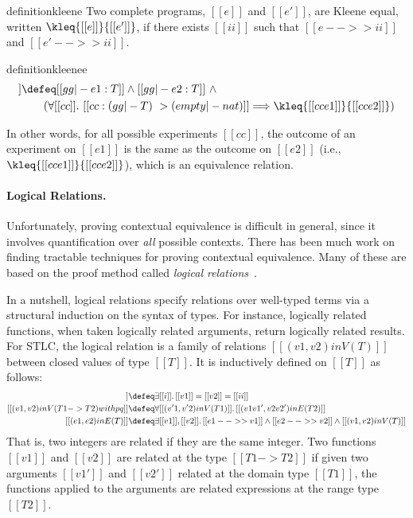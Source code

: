\begin{restatable}{definition}{kleene}
  Two complete programs, $[[e]]$ and $[[e']]$, are Kleene equal, written
  $\kleq{[[e]]}{[[e']]}$, if there exists $[[ii]]$ such that $[[e -->> ii]]$ and $[[e' -->> ii]]$.
\end{restatable}


\begin{restatable}{definition}{kleenee}  \label{def:cxtx}%
  \begin{align*}
    [[gg |- e1 ~= e2 : T]]  & \defeq [[gg |- e1 : T]] \land [[gg |- e2 : T]] \ \land \\
                                 & \qquad (\forall [[cc]].\ [[cc : (gg |- T) ~> (empty |- nat)]]  \Longrightarrow \kleq{[[cc{e1}]]}{[[cc{e2}]]})
  \end{align*}
\end{restatable}

In other words, for all possible experiments $[[ cc ]]$, the outcome of an
experiment on $[[e1]]$ is the same as the outcome on $[[e2]]$
(i.e., $\kleq{[[cc{e1}]]}{[[cc{e2}]]}$), which is an equivalence relation.


\paragraph{Logical Relations.}

Unfortunately, proving contextual equivalence is difficult in general, since it
involves quantification over \textit{all} possible contexts. There has been much
work on finding tractable techniques for proving contextual equivalence. Many
of these are based on the proof method called \emph{logical
  relations}~\citep{tait, plotkin1973lambda, statman1985logical}.

In a nutshell, logical relations specify relations over well-typed terms via a
structural induction on the syntax of types. For instance, logically related
functions, when taken logically related arguments, return logically related
results. For STLC, the logical relation is a family of relations $[[ (v1, v2) in V(T)  ]]$
between closed values of type $[[T]]$. It is inductively defined on $[[T]]$ as follows:
\begin{align*}
  [[(v1 , v2) in V ( nat ) with pq ]]  &\defeq  \exists [[i]].\, [[v1]] = [[v2]] = [[ii]] \\
  [[(v1 , v2) in V ( T1 -> T2 ) with pq ]]  & \defeq  \forall [[(v'1, v'2) in V (T1)  ]].\, [[  (v1 v1' , v2 v2') in E (T2)  ]] \\
  [[(e1, e2) in E (T)  ]] & \defeq \exists [[v1]], [[v2]].\, [[e1 -->> v1]] \land [[e2 -->> v2]] \land [[(v1, v2) in V (T) ]]
\end{align*}
That is, two integers are related if they are the same integer. Two functions
$[[v1]]$ and $[[v2]]$ are related at the type $[[T1 -> T2]]$ if given two
arguments $[[v1']]$ and $[[v2']]$ related at the domain type $[[T1]]$, the
functions applied to the arguments are related expressions at the range type
$[[T2]]$.


